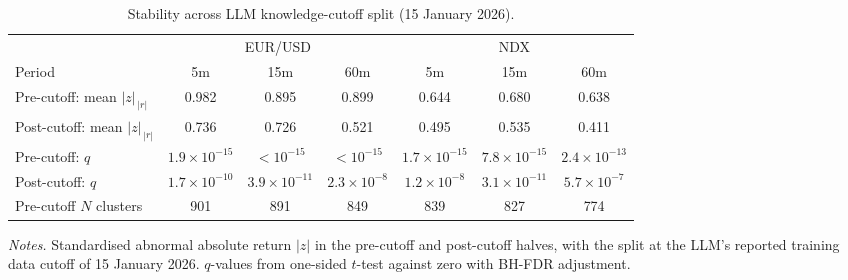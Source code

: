 \begin{table}[!htbp]
\centering
\caption{Stability across LLM knowledge-cutoff split (15 January 2026).}
\label{tab:pre-post}
\begin{threeparttable}
\small
\begin{tabular}{lcccccc}
\toprule
 & \multicolumn{3}{c}{EUR/USD} & \multicolumn{3}{c}{NDX} \\
\cmidrule(lr){2-4} \cmidrule(lr){5-7}
Period & 5m & 15m & 60m & 5m & 15m & 60m \\
\midrule
Pre-cutoff: mean $|z|_{\,|r|}$ & 0.982 & 0.895 & 0.899 & 0.644 & 0.680 & 0.638 \\
Post-cutoff: mean $|z|_{\,|r|}$ & 0.736 & 0.726 & 0.521 & 0.495 & 0.535 & 0.411 \\
Pre-cutoff: $q$ & $1.9\!\times\!10^{-15}$ & ${<}10^{-15}$ & ${<}10^{-15}$ & $1.7\!\times\!10^{-15}$ & $7.8\!\times\!10^{-15}$ & $2.4\!\times\!10^{-13}$ \\
Post-cutoff: $q$ & $1.7\!\times\!10^{-10}$ & $3.9\!\times\!10^{-11}$ & $2.3\!\times\!10^{-8}$ & $1.2\!\times\!10^{-8}$ & $3.1\!\times\!10^{-11}$ & $5.7\!\times\!10^{-7}$ \\
\addlinespace
Pre-cutoff $N$ clusters & 901 & 891 & 849 & 839 & 827 & 774 \\
\bottomrule
\end{tabular}
\begin{tablenotes}
\footnotesize
\item \textit{Notes.} Standardised abnormal absolute return $|z|$
in the pre-cutoff and post-cutoff halves, with the split at the LLM's
reported training data cutoff of 15 January 2026. $q$-values from
one-sided $t$-test against zero with BH-FDR adjustment.
\end{tablenotes}
\end{threeparttable}
\end{table}
